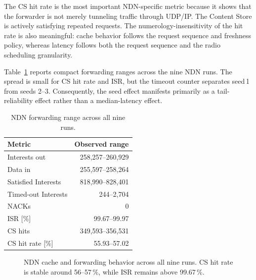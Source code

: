 \documentclass[journal]{IEEEtran}
\begin{document}
The CS hit rate is the most important NDN-specific metric because it shows that the forwarder is not merely tunneling traffic through UDP/IP. The Content Store is actively satisfying repeated requests. The numerology-insensitivity of the hit rate is also meaningful: cache behavior follows the request sequence and freshness policy, whereas latency follows both the request sequence and the radio scheduling granularity.

Table~\ref{tab:ndnfwd_ranges} reports compact forwarding ranges across the nine NDN runs. The spread is small for CS hit rate and ISR, but the timeout counter separates seed\,1 from seeds 2--3. Consequently, the seed effect manifests primarily as a tail-reliability effect rather than a median-latency effect.

\begin{table}[!t]\centering
\caption{NDN forwarding range across all nine runs.}
\label{tab:ndnfwd_ranges}
\footnotesize
\begin{tabular}{@{}lr@{}}
\toprule
Metric & Observed range\\
\midrule
Interests out & 258,257--260,929\\
Data in & 255,597--258,264\\
Satisfied Interests & 818,990--828,401\\
Timed-out Interests & 244--2,704\\
NACKs & 0\\
ISR [\%] & 99.67--99.97\\
CS hits & 349,593--356,531\\
CS hit rate [\%] & 55.93--57.02\\
\bottomrule
\end{tabular}
\end{table}

\begin{figure}[!t]\centering
{}
\caption{NDN cache and forwarding behavior across all nine runs. CS hit rate is stable around 56--57\,\%, while ISR remains above 99.67\,\%.}
\label{fig:cshr_v2}
\end{figure}
\end{document}
